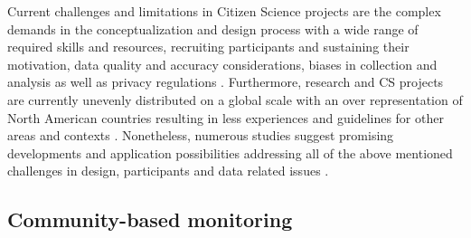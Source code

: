 Current challenges and limitations in Citizen Science projects are the complex demands in the conceptualization and design process with a wide range of required skills and resources, recruiting participants and sustaining their motivation, data quality and accuracy considerations, biases in collection and analysis as well as privacy regulations \autocite{fraislCitizenScienceEnvironmental2022}. Furthermore, research and CS projects are currently unevenly distributed on a global scale with an over representation of North American countries resulting in less experiences and guidelines for other areas and contexts \autocite{kirschkeCitizenScienceProjects2022, zhengCrowdsourcingMethodsData2018}. Nonetheless, numerous studies suggest promising developments and application possibilities addressing all of the above mentioned challenges in design, participants and data related issues \autocite{buckinghamshumGlobalParticipatoryPlatform2012,buddeParticipatorySensingParticipatory2017,escaECSACharacteristicsCitizen2020,fraislCitizenScienceEnvironmental2022,lowryGrowingPainsCrowdsourced2019,pocockStrategicFrameworkSupport,ruttenHowGetKeep2017,weeserCitizenSciencePioneers2018a}. 

\subsection{Community-based monitoring}\label{subsec:cbm}


